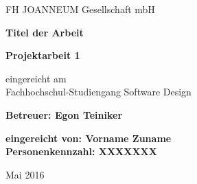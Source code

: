\begin{titlepage}

\begin{center}
\large

FH JOANNEUM Gesellschaft mbH

\vspace{4.0cm}
{\large\bf Titel der Arbeit}
  
\vspace{2.0cm}  
{\bf Projektarbeit 1}

\vspace{0.5cm}
eingereicht am \\
Fachhochschul-Studiengang Software Design

\vspace{2.0cm}
{\bf Betreuer: Egon Teiniker} 

\vspace{2.0cm}
 {\bf eingereicht von: Vorname Zuname\\
  Personenkennzahl: XXXXXXX}

\vspace{2cm}
Mai 2016     

\end{center}

\end{titlepage}
